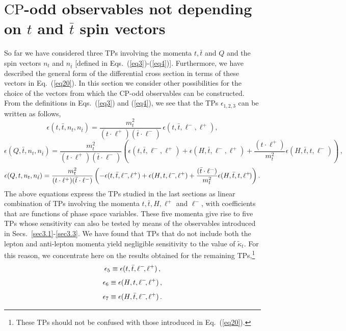 \documentclass[aps,preprint,tightenlines,floatfix,superscriptaddress,nofootinbib,showpacs]{revtex4-1}
\def\beq{\begin{equation}}
\def\eeq{\end{equation}}
\def\tbar{\bar{t}}
\def\kpt{\tilde{\kappa}_t}
\def\TPa{\epsilon(t,\tbar,n_t,n_{\tbar})}
\def\TPb{\epsilon(Q,\tbar,n_t,n_{\tbar})}
\def\TPc{\epsilon(Q,t,n_t,n_{\tbar})}
\begin{document}
\section{{\boldmath $\mathrm{CP}$}-odd observables not depending on \MakeLowercase{{\boldmath $t$}} and \MakeLowercase{{\boldmath $\tbar$}} spin vectors}
\label{sec4}
So far we have considered three TPs involving the momenta $t,\tbar$
and $Q$ and the spin vectors $n_t$ and $n_{\tbar}$ [defined in
Eqs.~(\ref{eq3})-(\ref{eq4})].  Furthermore, we have described the general
form of the differential cross section in terms of these vectors in
Eq.~(\ref{eq20}). In this section we consider other
possibilities for the choice of the vectors from which the
$\mathrm{CP}$-odd observables can be constructed. From the definitions
in Eqs.~(\ref{eq3}) and (\ref{eq4}), we see that the TPs
$\epsilon_{1,2,3}$ can be written as follows,
%
\beq
\label{eq29}
\TPa = \frac{m^2_t}{(t\cdot \ell^+)(\tbar\cdot \ell^-)}\,\epsilon(t,\tbar,\ell^-\!,\ell^+),
\eeq
%
\vspace*{1mm}
\beq
\label{eq30}
\TPb = \frac{m^2_t}{(t\cdot \ell^+)(\tbar\cdot \ell^-)}\left(\epsilon(t,\tbar,\ell^-\!,\ell^+)+\epsilon(H,\tbar,\ell^-\!,\ell^+)+\frac{(t\cdot\ell^+)}{m^2_t}\epsilon(H,\tbar,t,\ell^-\!)\right) \,,
\eeq
%
\vspace*{1mm}
\beq
\label{eq31}
\TPc = \frac{m^2_t}{(t\cdot \ell^+)(\tbar\cdot \ell^-)}\left(-\epsilon(t,\tbar,\ell^-\!,\ell^+)+\epsilon(H,t,\ell^-\!,\ell^+)+\frac{(\tbar\cdot\ell^-)}{m^2_t}\epsilon(H,\tbar,t,\ell^+\!)\right).
\vspace*{2mm}
\eeq
%
The above equations express the TPs studied in the last sections as
linear combination of TPs involving the momenta $t,\tbar,H,\ell^+$ and
$\ell^-$, with coefficients that are functions of phase space
variables. These five momenta give rise to five TPs whose sensitivity
can also be tested by means of the observables introduced in
Secs.~\ref{sec3.1}-\ref{sec3.3}.  We have found
that TPs that do not include both the lepton and anti-lepton momenta yield
negligible sensitivity to the value of $\kpt$.  For this reason,
we concentrate here on the
results obtained for the remaining TPs,\footnote{These TPs should not be confused with those introduced in Eq.~(\ref{eq20}).}
%
\beq
\label{eqa5}
\epsilon_5\equiv\epsilon(t,\tbar,\ell^-\!,\ell^+) \,,
\vspace*{1mm}
\eeq
%
\beq
\label{eqa6}
\epsilon_6\equiv\epsilon(H,t,\ell^-\!,\ell^+) \,,
\vspace*{1mm}
\eeq
%
\beq
\label{eqa7}
\epsilon_7\equiv\epsilon(H,\tbar,\ell^-\!,\ell^+) \,.
\vspace*{1mm}
\eeq
%
\end{document}
